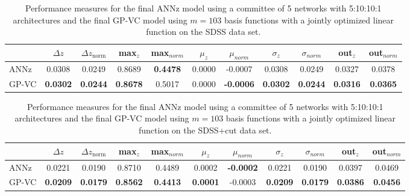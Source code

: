 \documentclass[useAMS,usenatbib,fleqn]{mn2e}
\begin{document}
 \begin{table}
\caption{Performance measures for the final {\sc ANNz} model using a committee of 5 networks with 5:10:10:1 architectures and the final GP-VC model using $m=103$ basis functions with a jointly optimized linear function on the SDSS data set.}
\begin{center}
\begin{tabular}{| l | c | c |  c | c |  c | c |  c | c |  c | c | }
     				&	$\Delta z$	&	$\Delta z_\textrm{norm}$	&	max$_{z}$ & max$_{norm}$		&	$\mu_{z}$&	$\mu_{norm}$	& $\sigma_{z}$ & $\sigma_{norm}$ & out$_{z}$&out$_{norm}$\\	\hline
	{\sc ANNz}		&	0.0308	&	0.0249		&	0.8689		&	\textbf{0.4478}&	0.0000		&	-0.0007 &	0.0308		&	0.0249&	0.0327		&	0.0378\\
	{\sc GP-VC } 	&	\textbf{0.0302} 	&	\textbf{0.0244}		&	\textbf{0.8678}	&	0.5017 & 0.0000		&	\textbf{-0.0006}&	\textbf{0.0302}		&	\textbf{0.0244}&	\textbf{0.0316} 	&	\textbf{0.0365}\\\hline
  \end{tabular}
\end{center}
\label{table-final-results-sdss}
\end{table}

 \begin{table}
\caption{Performance measures for the final {\sc ANNz} model using a committee of 5 networks with 5:10:10:1 architectures and the final GP-VC model using $m=103$ basis functions with a jointly optimized linear function on the SDSS+cut data set.}
\begin{center}
\begin{tabular}{| l | c | c |  c | c |  c | c |  c | c |  c | c | }
     				&	$\Delta z$	&	$\Delta z_\textrm{norm}$	&	max$_{z}$ & max$_{norm}$		&	$\mu_{z}$&	$\mu_{norm}$	& $\sigma_{z}$ & $\sigma_{norm}$ & out$_{z}$&out$_{norm}$\\	\hline
	{\sc ANNz}		&	0.0221	&	0.0190		&	0.8710		&	0.4489&	0.0002		&	\textbf{-0.0002}&	0.0221		&	0.0190&	0.0397		&	0.0469\\
	{\sc GP-VC } 	&	\textbf{0.0209} 	&	\textbf{0.0179}		&	\textbf{0.8562}	&	\textbf{0.4413} & \textbf{0.0001}		&	-0.0003&	\textbf{0.0209}		&	\textbf{0.0179}&	\textbf{0.0386} 	&	\textbf{0.0456}\\\hline
  \end{tabular}
\end{center}
\label{table-final-results-sdss-cut}
\end{table}
\end{document}
